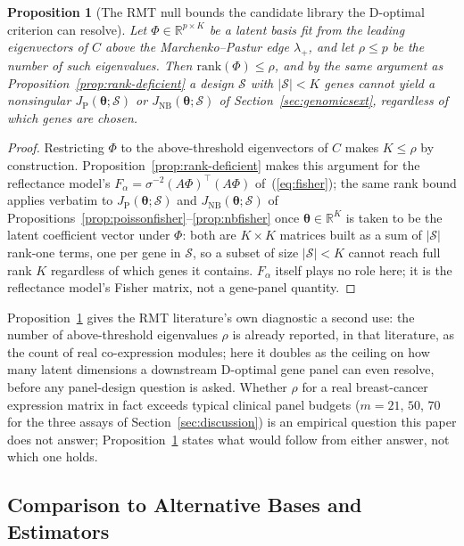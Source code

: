\documentclass[11pt]{article}
\newtheorem{Proposition}{Proposition}
\begin{document}
\begin{Proposition}[The RMT null bounds the candidate library the D-optimal criterion can resolve]
\label{prop:rmtbound}
Let $\Phi\in\mathbb{R}^{p\times K}$ be a latent basis fit from the leading eigenvectors of $C$ above the Marchenko--Pastur edge $\lambda_+$, and let $\rho\le p$ be the number of such eigenvalues. Then $\mathrm{rank}(\Phi)\le\rho$, and by the same argument as Proposition~\ref{prop:rank-deficient} a design $\mathcal{S}$ with $|\mathcal{S}|<K$ genes cannot yield a nonsingular $J_{\mathrm P}(\boldsymbol\theta;\mathcal{S})$ or $J_{\mathrm{NB}}(\boldsymbol\theta;\mathcal{S})$ of Section~\ref{sec:genomicsext}, regardless of which genes are chosen.
\end{Proposition}
\begin{proof}
Restricting $\Phi$ to the above-threshold eigenvectors of $C$ makes $K\le\rho$ by construction. Proposition~\ref{prop:rank-deficient} makes this argument for the reflectance model's $F_\alpha=\sigma^{-2}(A\Phi)^\top(A\Phi)$ of~(\ref{eq:fisher}); the same rank bound applies verbatim to $J_{\mathrm P}(\boldsymbol\theta;\mathcal{S})$ and $J_{\mathrm{NB}}(\boldsymbol\theta;\mathcal{S})$ of Propositions~\ref{prop:poissonfisher}--\ref{prop:nbfisher} once $\boldsymbol\theta\in\mathbb{R}^K$ is taken to be the latent coefficient vector under $\Phi$: both are $K\times K$ matrices built as a sum of $|\mathcal{S}|$ rank-one terms, one per gene in $\mathcal{S}$, so a subset of size $|\mathcal{S}|<K$ cannot reach full rank $K$ regardless of which genes it contains. $F_\alpha$ itself plays no role here; it is the reflectance model's Fisher matrix, not a gene-panel quantity.
\end{proof}

Proposition~\ref{prop:rmtbound} gives the RMT literature's own diagnostic a second use: the number of above-threshold eigenvalues $\rho$ is already reported, in that literature, as the count of real co-expression modules; here it doubles as the ceiling on how many latent dimensions a downstream D-optimal gene panel can even resolve, before any panel-design question is asked. Whether $\rho$ for a real breast-cancer expression matrix in fact exceeds typical clinical panel budgets ($m=21$, $50$, $70$ for the three assays of Section~\ref{sec:discussion}) is an empirical question this paper does not answer; Proposition~\ref{prop:rmtbound} states what would follow from either answer, not which one holds.

\subsection{Comparison to Alternative Bases and Estimators}
\end{document}
